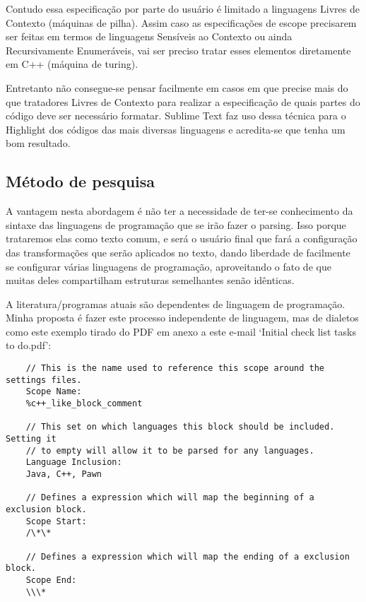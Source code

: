 {    Contudo essa especificação por parte do usuário é limitado a linguagens Livres de Contexto
    (máquinas de pilha). Assim caso as especificações de escope precisarem ser feitas em termos de
    linguagens Sensíveis ao Contexto ou ainda Recursivamente Enumeráveis, vai ser preciso tratar
    esses elementos diretamente em C++ (máquina de turing).

    Entretanto não consegue-se pensar facilmente em casos em que precise mais do que tratadores
    Livres de Contexto para realizar a especificação de quais partes do código deve ser necessário
    formatar. Sublime Text faz uso dessa técnica para o Highlight dos códigos das mais diversas
    linguagens e acredita-se que tenha um bom resultado.





\subsection{Método de pesquisa}

    A vantagem nesta abordagem é não ter a necessidade de ter-se conhecimento da sintaxe das
    linguagens de programação que se irão fazer o parsing. Isso porque trataremos elas como texto
    comum, e será o usuário final que fará a configuração das transformações que serão aplicados no
    texto, dando liberdade de facilmente se configurar várias linguagens de programação,
    aproveitando o fato de que muitas deles compartilham estruturas semelhantes senão idênticas.

    A literatura/programas atuais são dependentes de linguagem de programação. Minha proposta é
    fazer este processo independente de linguagem, mas de dialetos como este exemplo tirado do PDF
    em anexo a este e-mail `Initial check list tasks to do.pdf':

    \begin{lstlisting}
    // This is the name used to reference this scope around the settings files.
    Scope Name:
    %c++_like_block_comment

    // This set on which languages this block should be included. Setting it
    // to empty will allow it to be parsed for any languages.
    Language Inclusion:
    Java, C++, Pawn

    // Defines a expression which will map the beginning of a exclusion block.
    Scope Start:
    /\*\*

    // Defines a expression which will map the ending of a exclusion block.
    Scope End:
    \\\*
    \end{lstlisting}
    \vspace*{-4mm}

}
